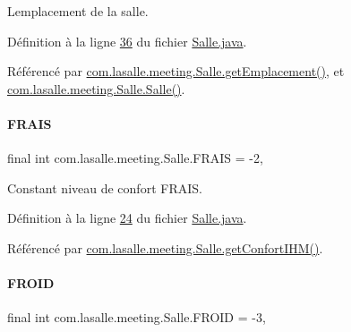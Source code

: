 L\textquotesingle{}emplacement de la salle. 



Définition à la ligne \hyperlink{_salle_8java_source_l00036}{36} du fichier \hyperlink{_salle_8java_source}{Salle.\+java}.



Référencé par \hyperlink{_salle_8java_source_l00156}{com.\+lasalle.\+meeting.\+Salle.\+get\+Emplacement()}, et \hyperlink{_salle_8java_source_l00054}{com.\+lasalle.\+meeting.\+Salle.\+Salle()}.

\mbox{\label{classcom_1_1lasalle_1_1meeting_1_1_salle_aff34072175ff3c1bc425a8bacc31ff4b}} 
\paragraph{\texorpdfstring{F\+R\+A\+IS}{FRAIS}}
{\footnotesize\ttfamily final int com.\+lasalle.\+meeting.\+Salle.\+F\+R\+A\+IS = -\/2\hspace{0.3cm}{\ttfamily [static]}, {\ttfamily [private]}}



Constant niveau de confort F\+R\+A\+IS. 



Définition à la ligne \hyperlink{_salle_8java_source_l00024}{24} du fichier \hyperlink{_salle_8java_source}{Salle.\+java}.



Référencé par \hyperlink{_salle_8java_source_l00233}{com.\+lasalle.\+meeting.\+Salle.\+get\+Confort\+I\+H\+M()}.

\mbox{\label{classcom_1_1lasalle_1_1meeting_1_1_salle_a1b29ac9518653cc15391c4deed380fbb}} 
\paragraph{\texorpdfstring{F\+R\+O\+ID}{FROID}}
{\footnotesize\ttfamily final int com.\+lasalle.\+meeting.\+Salle.\+F\+R\+O\+ID = -\/3\hspace{0.3cm}{\ttfamily [static]}, {\ttfamily [private]}}



